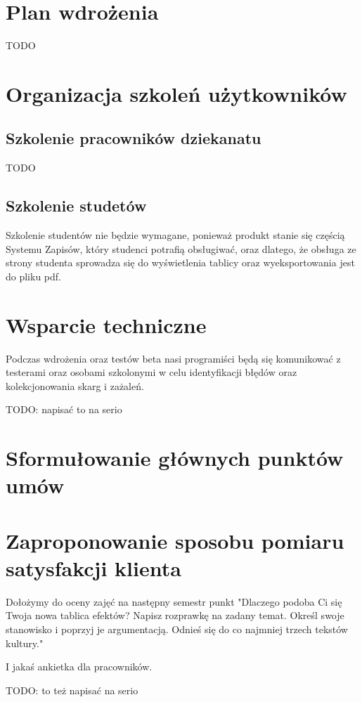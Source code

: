 \documentclass{article}
\begin{document}
\section{Plan wdrożenia}
TODO

\section{Organizacja szkoleń użytkowników}

\subsection{Szkolenie pracowników dziekanatu}
TODO

\subsection{Szkolenie studetów}
Szkolenie studentów nie będzie wymagane, ponieważ produkt stanie się częścią Systemu Zapisów, który studenci potrafią obsługiwać, oraz dlatego, że obsługa ze strony studenta sprowadza się do wyświetlenia tablicy oraz wyeksportowania jest do pliku pdf.

\section{Wsparcie techniczne}
Podczas wdrożenia oraz testów beta nasi programiści będą się komunikować z testerami oraz osobami szkolonymi w celu identyfikacji błędów oraz kolekcjonowania skarg i zażaleń.

TODO: napisać to na serio

\section{Sformułowanie głównych punktów umów}

\section{Zaproponowanie sposobu pomiaru satysfakcji klienta}
Dołożymy do oceny zajęć na następny semestr punkt "Dlaczego podoba Ci się Twoja nowa tablica efektów? Napisz rozprawkę na zadany temat. Określ swoje stanowisko i poprzyj je argumentacją. Odnieś się do co najmniej trzech tekstów kultury."

I jakaś ankietka dla pracowników.

TODO: to też napisać na serio
\end{document}
